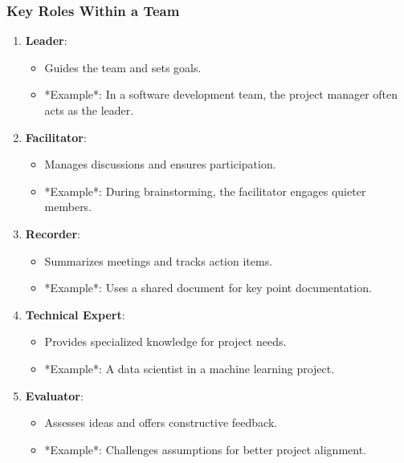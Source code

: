\documentclass{beamer}
\begin{document}
\begin{frame}[fragile]
    \frametitle{Key Roles Within a Team}
    \begin{enumerate}
        \item \textbf{Leader}:
            \begin{itemize}
                \item Guides the team and sets goals.
                \item *Example*: In a software development team, the project manager often acts as the leader.
            \end{itemize}
        \item \textbf{Facilitator}:
            \begin{itemize}
                \item Manages discussions and ensures participation.
                \item *Example*: During brainstorming, the facilitator engages quieter members.
            \end{itemize}
        \item \textbf{Recorder}:
            \begin{itemize}
                \item Summarizes meetings and tracks action items.
                \item *Example*: Uses a shared document for key point documentation.
            \end{itemize}
        \item \textbf{Technical Expert}:
            \begin{itemize}
                \item Provides specialized knowledge for project needs.
                \item *Example*: A data scientist in a machine learning project.
            \end{itemize}
        \item \textbf{Evaluator}:
            \begin{itemize}
                \item Assesses ideas and offers constructive feedback.
                \item *Example*: Challenges assumptions for better project alignment.
            \end{itemize}
    \end{enumerate}
\end{frame}
\end{document}
